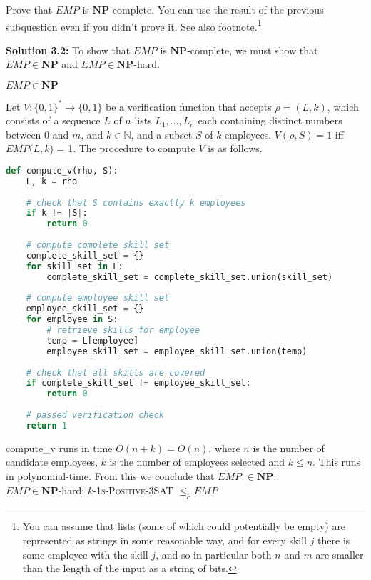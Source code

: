\documentclass[11pt]{article}
\begin{document}
Prove that \(EMP\) is \(\mathbf{NP}\)-complete. You can use the result
of the previous subquestion even if you didn't prove it. See also
footnote.\footnote{You can assume that lists (some of which could
	potentially be empty) are represented as strings in some reasonable
	way, and for every skill \(j\) there is some employee with the skill
	\(j\), and so in particular both \(n\) and \(m\) are smaller than the
	length of the input as a string of bits.}

\textbf{Solution 3.2:}
To show that \(EMP\) is \(\mathbf{NP}\)-complete, we must show that $EMP \in \mathbf{NP}$ and $EMP \in \mathbf{NP}$-hard.

$EMP \in \mathbf{NP}$

Let $V: \{0, 1\}^* \to \{0, 1\}$ be a verification function that accepts $\rho = (L, k)$, which consists of a sequence \(L\) of \(n\) lists \(L_1,\ldots,L_n\) each containing distinct numbers between \(0\) and \(m\), and $k\in \mathbb{N}$, and a subset $S$ of $k$ employees. $V(\rho, S) = 1$ iff $EMP(L, k$) = 1. The procedure to compute $V$ is as follows.

\begin{lstlisting}[language=Python]
def compute_v(rho, S):
    L, k = rho
    
    # check that S contains exactly k employees
    if k != |S|:
        return 0
    
    # compute complete skill set
    complete_skill_set = {}
    for skill_set in L:
        complete_skill_set = complete_skill_set.union(skill_set)
    
    # compute employee skill set
    employee_skill_set = {}
    for employee in S:
        # retrieve skills for employee
        temp = L[employee]
        employee_skill_set = employee_skill_set.union(temp)
        
    # check that all skills are covered
    if complete_skill_set != employee_skill_set:
        return 0
    
    # passed verification check
    return 1
\end{lstlisting}

compute\_v runs in time $O(n + k) = O(n)$, where $n$ is the number of candidate employees, $k$ is the number of employees selected and $k \leq n$. This runs in polynomial-time. From this we conclude that \(EMP\) $\in \mathbf{NP}$.\\

$EMP \in \mathbf{NP}$-hard: \textsc{$k$-1s-Positive-3SAT} $\leq_p EMP$ 
\end{document}
